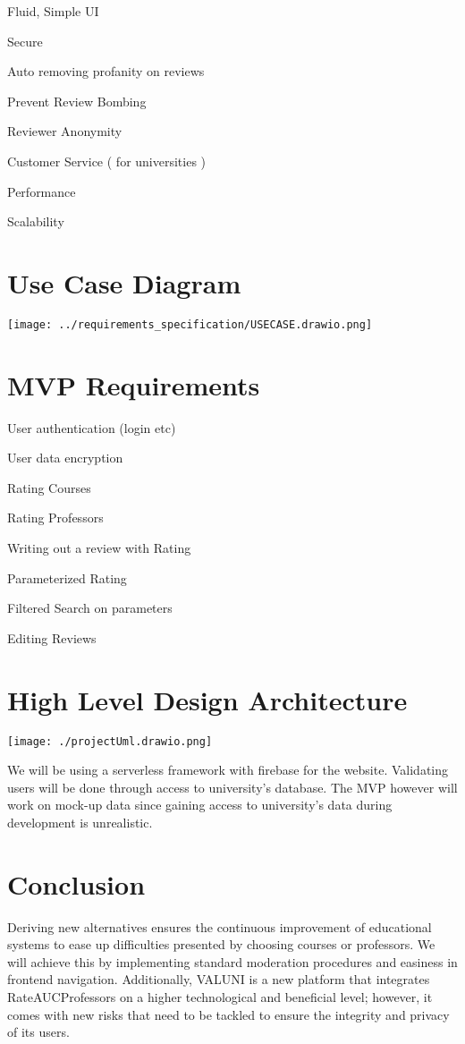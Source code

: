\documentclass{article}
\begin{document}
	\quad Fluid, Simple UI

	\quad Secure

	\quad Auto removing profanity on reviews

	\quad Prevent Review Bombing

	\quad Reviewer Anonymity

	\quad Customer Service ( for universities )

	\quad Performance

	\quad Scalability

\section{Use Case Diagram} 

\begin{center}
	\texttt{[image: ../requirements\_specification/USECASE.drawio.png]}	
\end{center}

\section{MVP Requirements}

	\quad User authentication (login etc)

	\quad User data encryption

	\quad Rating Courses

	\quad Rating Professors

	\quad Writing out a review with Rating

	\quad Parameterized Rating

	\quad Filtered Search on parameters	

	\quad Editing Reviews


\section{High Level Design Architecture}

\begin{center} 
	\texttt{[image: ./projectUml.drawio.png]}
\end{center}

\quad We will be using a serverless framework with firebase for the website. Validating users will be done through access to university's database. The MVP however will work on mock-up data since gaining access to university's data during development is unrealistic.

\section{Conclusion}

\quad Deriving new alternatives ensures the continuous improvement of educational systems to ease up difficulties presented by choosing courses or professors. We will achieve this by implementing standard moderation procedures and easiness in frontend navigation. Additionally,  VALUNI is a new platform that integrates RateAUCProfessors on a higher technological and beneficial level; however, it comes with new risks that need to be tackled to ensure the integrity and privacy of its users. 
\end{document}
